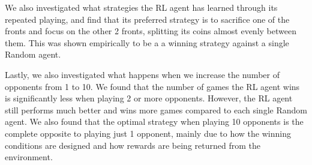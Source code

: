 \documentclass[11pt, oneside]{article}   	%
\begin{document}
\hfill

We also investigated what strategies the RL agent has learned through its repeated playing, and find that its preferred strategy is to sacrifice one of the fronts and focus on the other 2 fronts, splitting its coins almost evenly between them. This was shown empirically to be a a winning strategy against a single Random agent.

\hfill

Lastly, we also investigated what happens when we increase the number of opponents from 1 to 10. We found that the number of games the RL agent wins is significantly less when playing 2 or more opponents. However, the RL agent still performs much better and wins more games compared to each single Random agent. We also found that the optimal strategy when playing 10 opponents is the complete opposite to playing just 1 opponent, mainly due to how the winning conditions are designed and how rewards are being returned from the environment.

\nocite{*}


\end{document}
